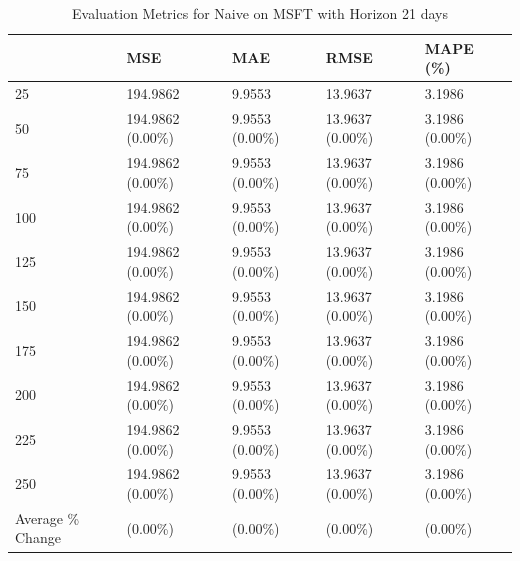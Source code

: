 \begin{table}
\caption{Evaluation Metrics for Naive on MSFT with Horizon 21 days}
\label{tab:naive_MSFT_h21_metrics}
\begin{tabular}{lllll}
\toprule
 & MSE & MAE & RMSE & MAPE (\%) \\
\midrule
25 & 194.9862 & 9.9553 & 13.9637 & 3.1986 \\
50 & 194.9862 (0.00\%) & 9.9553 (0.00\%) & 13.9637 (0.00\%) & 3.1986 (0.00\%) \\
75 & 194.9862 (0.00\%) & 9.9553 (0.00\%) & 13.9637 (0.00\%) & 3.1986 (0.00\%) \\
100 & 194.9862 (0.00\%) & 9.9553 (0.00\%) & 13.9637 (0.00\%) & 3.1986 (0.00\%) \\
125 & 194.9862 (0.00\%) & 9.9553 (0.00\%) & 13.9637 (0.00\%) & 3.1986 (0.00\%) \\
150 & 194.9862 (0.00\%) & 9.9553 (0.00\%) & 13.9637 (0.00\%) & 3.1986 (0.00\%) \\
175 & 194.9862 (0.00\%) & 9.9553 (0.00\%) & 13.9637 (0.00\%) & 3.1986 (0.00\%) \\
200 & 194.9862 (0.00\%) & 9.9553 (0.00\%) & 13.9637 (0.00\%) & 3.1986 (0.00\%) \\
225 & 194.9862 (0.00\%) & 9.9553 (0.00\%) & 13.9637 (0.00\%) & 3.1986 (0.00\%) \\
250 & 194.9862 (0.00\%) & 9.9553 (0.00\%) & 13.9637 (0.00\%) & 3.1986 (0.00\%) \\
Average \% Change & (0.00\%) & (0.00\%) & (0.00\%) & (0.00\%) \\
\bottomrule
\end{tabular}
\end{table}
